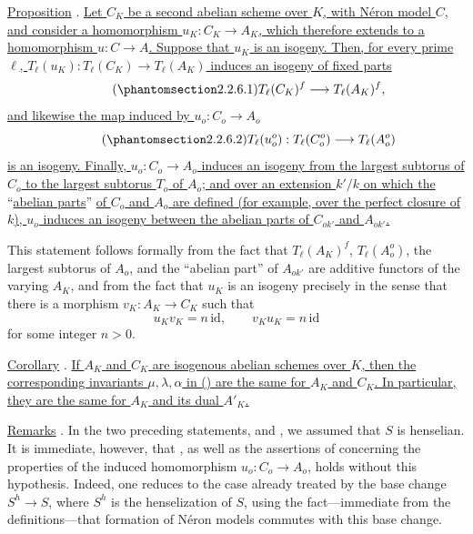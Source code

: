 \medskip
\noindent
\underline{Proposition} . \underline{Let $C_K$ be a second
abelian scheme over $K$, with N\'{e}ron model $C$, and consider a
homomorphism $u_K:C_K\longrightarrow A_K$, which therefore extends to
a homomorphism $u:C\longrightarrow A$.  Suppose that $u_K$ is an
isogeny.  Then, for every prime $\ell$,
$T_\ell(u_K):T_\ell(C_K)\longrightarrow T_\ell(A_K)$ induces an
isogeny of fixed parts}
\begin{equation}\tag{\SGARefTarget{sga7.sga7i.eix.n2-2-6-1}{2.2.6.1}}
 T_\ell(C_K)^f\longrightarrow T_\ell(A_K)^f,
\end{equation}
\underline{and likewise the map induced by
$u_o:C_o\longrightarrow A_o$}
\begin{equation}\tag{\SGARefTarget{sga7.sga7i.eix.n2-2-6-2}{2.2.6.2}}
 T_\ell(u_o^o):T_\ell(C_o^o)\longrightarrow T_\ell(A_o^o)
\end{equation}
\underline{is an isogeny.  Finally, $u_o:C_o\longrightarrow A_o$
induces an isogeny from the largest subtorus of $C_o$ to the largest
subtorus $T_o$ of $A_o$; and over an extension $k'/k$ on which the}
``\underline{abelian parts}'' \underline{of $C_o$ and $A_o$ are defined (for example, over
the perfect closure of $k$), $u_o$ induces an isogeny between the
abelian parts of $C_{ok'}$ and $A_{ok'}$.}

This statement follows formally from the fact that
$T_\ell(A_K)^f$, $T_\ell(A_o^o)$, the largest subtorus of $A_o$, and
the ``abelian part'' of $A_{ok'}$ are additive functors of the varying
$A_K$, and from the fact that $u_K$ is an isogeny precisely in the
sense that there is a morphism $v_K:A_K\longrightarrow C_K$ such that
\[
 u_Kv_K=n\,\mathrm{id},\qquad v_Ku_K=n\,\mathrm{id}
\]
for some integer $n>0$.

\medskip
\noindent
\underline{Corollary} . \underline{If $A_K$ and $C_K$ are
isogenous abelian schemes over $K$, then the corresponding invariants
$\mu,\lambda,\alpha$ in () are the same for $A_K$ and $C_K$.
In particular, they are the same for $A_K$ and its dual $A'_K$.}

\medskip
\noindent
\underline{Remarks} . In the two preceding statements,  and
, we assumed that $S$ is henselian.  It is immediate, however,
that , as well as the assertions of  concerning the
properties of the induced homomorphism
$u_o:C_o\longrightarrow A_o$, holds without this hypothesis.  Indeed,
one reduces to the case already treated by the base change
$S^h\longrightarrow S$, where $S^h$ is the henselization of $S$, using
the fact---immediate from the definitions---that formation of N\'{e}ron
models commutes with this base change.

